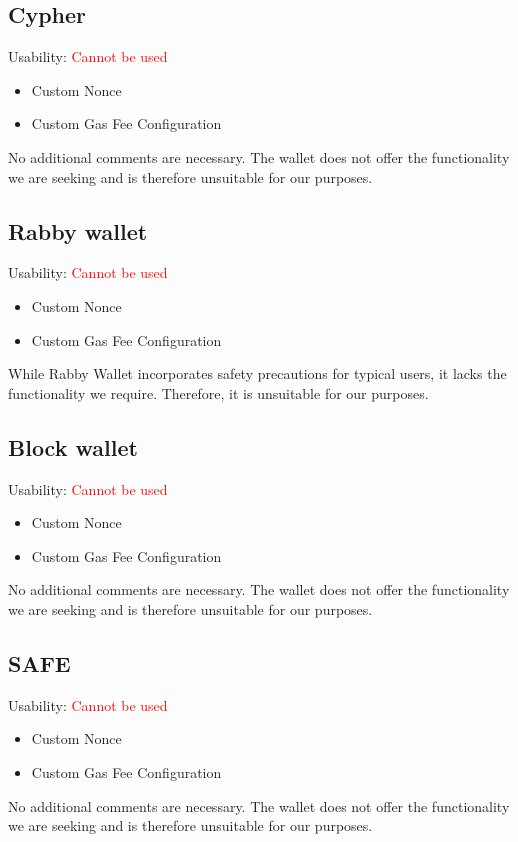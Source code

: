 \documentclass[fleqn,10pt]{olplainarticle}
\newcommand{\xmark}{\ding{55}}%
\begin{document}
\subsection{Cypher}
Usability: \textcolor{red}{Cannot be used}
\begin{itemize}[noitemsep, nolistsep]
	\item [\textcolor{red}{\xmark}] Custom Nonce
	\item [\textcolor{red}{\xmark}] Custom Gas Fee Configuration
\end{itemize}
No additional comments are necessary. The wallet does not offer the functionality we are seeking and is therefore unsuitable for our purposes.

\subsection{Rabby wallet}
Usability: \textcolor{red}{Cannot be used}
\begin{itemize}[noitemsep, nolistsep]
	\item [\textcolor{red}{\xmark}] Custom Nonce
	\item [\textcolor{red}{\xmark}] Custom Gas Fee Configuration
\end{itemize}
While Rabby Wallet incorporates safety precautions for typical users, it lacks the functionality we require. Therefore, it is unsuitable for our purposes.

\subsection{Block wallet}
Usability: \textcolor{red}{Cannot be used}
\begin{itemize}[noitemsep, nolistsep]
	\item [\textcolor{red}{\xmark}] Custom Nonce
	\item [\textcolor{red}{\xmark}] Custom Gas Fee Configuration
\end{itemize}
No additional comments are necessary. The wallet does not offer the functionality we are seeking and is therefore unsuitable for our purposes.

\subsection{SAFE}
Usability: \textcolor{red}{Cannot be used}
\begin{itemize}[noitemsep, nolistsep]
	\item [\textcolor{red}{\xmark}] Custom Nonce
	\item [\textcolor{red}{\xmark}] Custom Gas Fee Configuration
\end{itemize}
No additional comments are necessary. The wallet does not offer the functionality we are seeking and is therefore unsuitable for our purposes.
\end{document}
